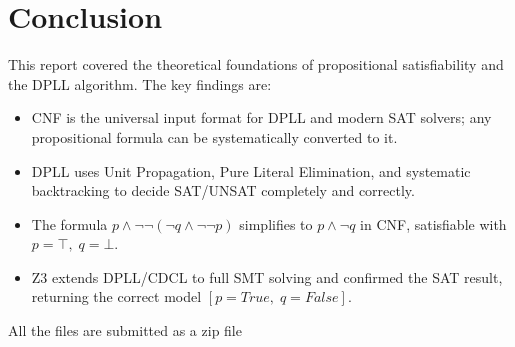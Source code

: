 \documentclass[11pt, a4paper]{article}
\begin{document}
\section{Conclusion}

This report covered the theoretical foundations of propositional
satisfiability and the DPLL algorithm. The key findings are:

\begin{itemize}
  \item CNF is the universal input format for DPLL and modern SAT solvers;
        any propositional formula can be systematically converted to it.
  \item DPLL uses Unit Propagation, Pure Literal Elimination, and systematic
        backtracking to decide SAT/UNSAT completely and correctly.
  \item The formula $p \land \lnot\lnot(\lnot q \land \lnot\lnot p)$
        simplifies to $p \land \lnot q$ in CNF, satisfiable with
        $p = \top,\; q = \bot$.
  \item Z3 extends DPLL/CDCL to full SMT solving and confirmed the SAT result,
        returning the correct model $[p = \textit{True},\; q = \textit{False}]$.
\end{itemize}

\begin{tcolorbox}[greenstyle]
All the files are submitted as a zip file 
\end{tcolorbox}
\end{document}
